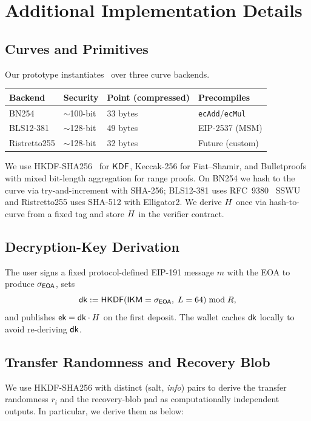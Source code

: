 \section{Additional Implementation Details}
\label{sec:impl}

\subsection{Curves and Primitives}

Our prototype instantiates \CM\ over three curve backends.
%
\begin{center}
\begin{tabular}{@{}l l l l@{}}
  \toprule
  \textbf{Backend} & \textbf{Security} & \textbf{Point (compressed)} & \textbf{Precompiles} \\
  \midrule
  BN254         & $\sim$100-bit & 33 bytes & \texttt{ecAdd}/\texttt{ecMul} \\
  BLS12-381     & $\sim$128-bit & 49 bytes & EIP-2537 (MSM) \\
  Ristretto255  & $\sim$128-bit & 32 bytes & Future (custom) \\
  \bottomrule
\end{tabular}
\end{center}

We use HKDF-SHA256~\cite{rfc5869} for $\mathsf{KDF}$, Keccak-256 for Fiat--Shamir, and Bulletproofs~\cite{bunz2018bulletproofs} with mixed bit-length aggregation for range proofs.
On BN254 we hash to the curve via try-and-increment with SHA-256; BLS12-381 uses RFC~9380~\cite{rfc9380} SSWU and Ristretto255 uses SHA-512 with Elligator2.
We derive $H$ once via hash-to-curve from a fixed tag and store $H$ in the verifier contract.

\subsection{Decryption-Key Derivation}
\label{impl:dk}

The user signs a fixed protocol-defined EIP-191 message $m$ with the EOA to produce $\sigma_{\sf EOA}$, sets
%
\[
  \textsf{dk} := \mathsf{HKDF}(\mathsf{IKM} = \sigma_{\sf EOA},\; L = 64) \bmod R,
\]
%
and publishes $\textsf{ek} = \textsf{dk} \cdot H$ on the first deposit.
The wallet caches $\textsf{dk}$ locally to avoid re-deriving $\textsf{dk}$.

\subsection{Transfer Randomness and Recovery Blob}
\label{impl:hkdf}
We use HKDF-SHA256 with distinct (salt, \emph{info}) pairs to derive the transfer randomness $r_i$ and the recovery-blob pad as computationally independent outputs. In particular, we derive them as below:

